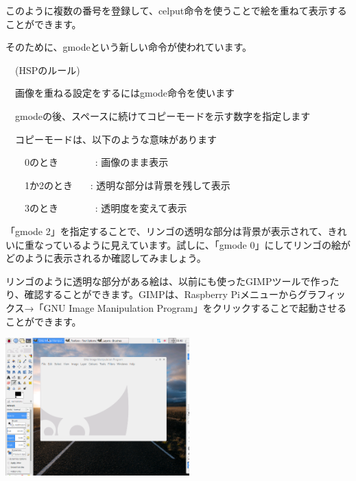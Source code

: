 \documentclass[a4paper,dvipdfmx]{jarticle}
\begin{document}
\bigskip


\bigskip


\bigskip


\bigskip


\bigskip


\bigskip


\bigskip


\bigskip

このように複数の番号を登録して、celput命令を使うことで絵を重ねて表示することができます。

そのために、gmodeという新しい命令が使われています。


\bigskip

\ \ (HSPのルール)


\bigskip

\ \ 画像を重ねる設定をするにはgmode命令を使います

\ \ gmodeの後、スペースに続けてコピーモードを示す数字を指定します

\ \ コピーモードは、以下のような意味があります

\ \ \ \ 0のとき \ \ \ \ \ \ \ : 画像のまま表示

\ \ \ \ 1か2のとき \ \ \ :
透明な部分は背景を残して表示

\ \ \ \ 3のとき \ \ \ \ \ \ \ : 透明度を変えて表示


\bigskip

「gmode
2」を指定することで、リンゴの透明な部分は背景が表示されて、きれいに重なっているように見えています。試しに、「gmode
0」にしてリンゴの絵がどのように表示されるか確認してみましょう。

リンゴのように透明な部分がある絵は、以前にも使ったGIMPツールで作ったり、確認することができます。GIMPは、Raspberry
Piメニューからグラフィックス→「GNU Image
Manipulation
Program」をクリックすることで起動させることができます。


\bigskip



\begin{center}
\includegraphics[width=7.091cm,height=5.318cm]{text04-img/text04-img018.png}

\end{center}
\end{document}
